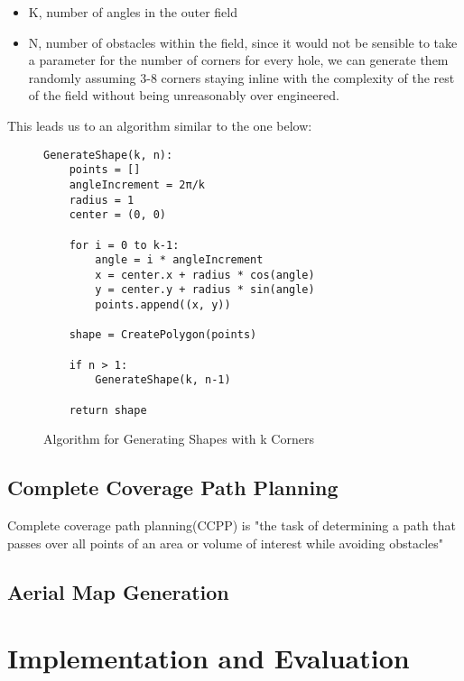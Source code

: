 \documentclass[final]{cmpreport_02}
\begin{document}
\begin{itemize}
    \item K, number of angles in the outer field
    \item N, number of obstacles within the field, since it would not be sensible to take a parameter for the number of corners for every hole, we can generate them randomly assuming 3-8 corners staying inline with the complexity of the rest of the field without being unreasonably over engineered.
\end{itemize}

This leads us to an algorithm similar to the one below:


\begin{figure}[h!]
\caption{Algorithm for Generating Shapes with k Corners}
\begin{verbatim}
GenerateShape(k, n):
    points = []
    angleIncrement = 2π/k
    radius = 1
    center = (0, 0)
    
    for i = 0 to k-1:
        angle = i * angleIncrement
        x = center.x + radius * cos(angle)
        y = center.y + radius * sin(angle)
        points.append((x, y))
    
    shape = CreatePolygon(points)
    
    if n > 1:
        GenerateShape(k, n-1)
        
    return shape
\end{verbatim}
\end{figure}

\subsection{Complete Coverage Path Planning}
Complete coverage path planning(CCPP) is "the task of determining a path that passes over all points of an area or volume of interest while avoiding obstacles" \cite{zhao2023complete}






\subsection{Aerial Map Generation}



\section{Implementation and Evaluation}
\end{document}
